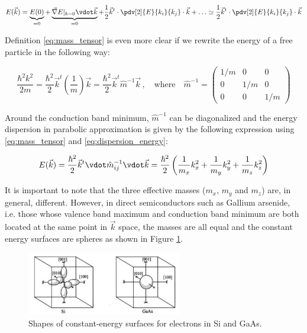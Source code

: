 \documentclass[11pt,a4paper]{article}
\begin{document}
\begin{equation}\label{eq:dispersion_energy}
E(\vec{k})=\underbrace{E(0)}_\text{=0}+\underbrace{\vec{\nabla}E|_{k=0}\vdot \vec{k}}_\text{=0}+\frac{1}{2}\vec{k}^t\cdot\pdv[2]{E}{k_i}{k_j}\cdot\vec{k}+\ldots\simeq\frac{1}{2}\vec{k}^t\cdot\pdv[2]{E}{k_i}{k_j}\cdot\vec{k}
\end{equation}

Definition \eqref{eq:mass_tensor} is even more clear if we rewrite the energy of a free particle in the following way:

\begin{equation*}
\frac{\hbar^2k^2}{2m}=\frac{\hbar^2}{2}\vec{k}^t\left(\frac{1}{m}\right)\vec{k}=\frac{\hbar^2}{2}\vec{k}^t\hat{m}^{-1}\vec{k}\,,
\quad\text{where}\quad\hat{m}^{-1}=
\begin{pmatrix*}
1/m & 0 & 0 \\
0 & 1/m & 0 \\
0 & 0 & 1/m
\end{pmatrix*}
\end{equation*}

Around the conduction band minimum, $\hat{m}^{-1}$ can be diagonalized and the energy dispersion in parabolic approximation is given by the following expression using \eqref{eq:mass_tensor} and \eqref{eq:dispersion_energy}:

\begin{equation}\label{eq:energy_dispersion}
E(\vec{k})=\frac{\hbar^2}{2}\vec{k}^t\vdot\hat{m}_{ij}^{-1}\vdot\vec{k}=\frac{\hbar^2}{2}\left(\frac{1}{m_x}k_x^2+\frac{1}{m_y}k_y^2+\frac{1}{m_z}k_z^2\right)
\end{equation}

It is important to note that the three effective masses ($m_x$, $m_y$ and $m_z$) are, in general, different. However, in direct semiconductors such as Gallium arsenide, i.e. those whose valence band maximum and conduction band minimum are both located at the same point in $\vec{k}$ space, the masses are all equal and the constant energy surfaces are spheres as shown in Figure \ref{fig:energy_surfaces}.

\begin{figure}[ht]
\centering
\includegraphics[width=0.6\textwidth]{energy_surfaces}
\caption{Shapes of constant-energy surfaces for electrons in Si and GaAs.\cite{sze2006physics}}
\label{fig:energy_surfaces}
\end{figure}
\end{document}
